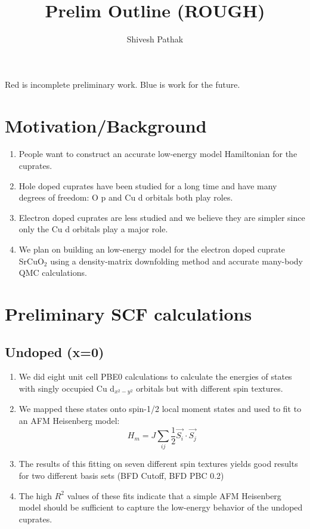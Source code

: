 \documentclass{article}
\title{Prelim Outline (ROUGH)}
\author{Shivesh Pathak}
\begin{document}
\maketitle

\color{red} Red \color{black} is incomplete preliminary work.
\color{blue} Blue \color{black} is work for the future.

\section{Motivation/Background}
\begin{enumerate}
\item People want to construct an accurate low-energy model Hamiltonian for the cuprates.
\item Hole doped cuprates have been studied for a long time and have many degrees of freedom: O p and Cu d orbitals both play roles.
\item Electron doped cuprates are less studied and we believe they are simpler since only the Cu d orbitals play a major role.
\item We plan on building an low-energy model for the electron doped cuprate SrCuO$_2$ using a density-matrix downfolding method and accurate many-body QMC calculations.
\end{enumerate}

\section{Preliminary SCF calculations}
\subsection{Undoped (x=0)}
\begin{enumerate}
\item We did eight unit cell PBE0 calculations to calculate the energies of states with singly occupied Cu d$_{x^2-y^2}$ orbitals but with different spin textures.

\item We mapped these states onto spin-1/2 local moment states and used to fit to an AFM Heisenberg model:
$$H_m = J\sum_{ij} \frac{1}{2} \vec{S_i}\cdot\vec{S_j} $$ 

\item The results of this fitting on seven different spin textures yields good results for two different basis sets (BFD Cutoff, BFD PBC 0.2)

\item The high $R^2$ values of these fits indicate that a simple AFM Heisenberg model should be sufficient to capture the low-energy behavior of the undoped cuprates.
\end{enumerate}
\end{document}
